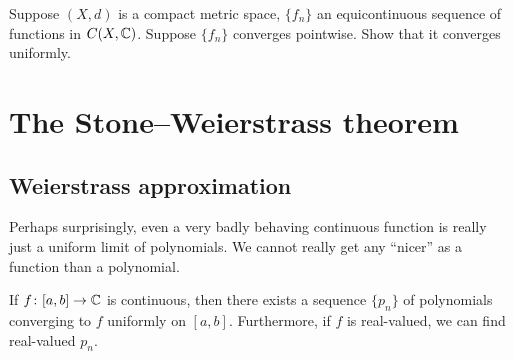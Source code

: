 \begin{exercise}
Suppose $(X,d)$ is a compact metric space, $\{ f_n \}$ an equicontinuous
sequence of functions in $C(X,{\mathbb{C}})$.  Suppose $\{ f_n \}$ converges
pointwise.  Show that it converges uniformly.
\end{exercise}



\sectionnewpage
\section{The Stone--Weierstrass theorem}
\label{sec:stoneweier}


\subsection{Weierstrass approximation}

Perhaps surprisingly, even a very badly behaving continuous function is really
just a uniform limit of polynomials.  We cannot really get any ``nicer'' as
a function than a polynomial.

\begin{thm}
If $f \colon [a,b] \to {\mathbb{C}}$ is continuous, then there exists a sequence $\{
p_n \}$ of polynomials converging to $f$ uniformly on $[a,b]$.
Furthermore, if $f$ is real-valued, we can find real-valued $p_n$.
\end{thm}

